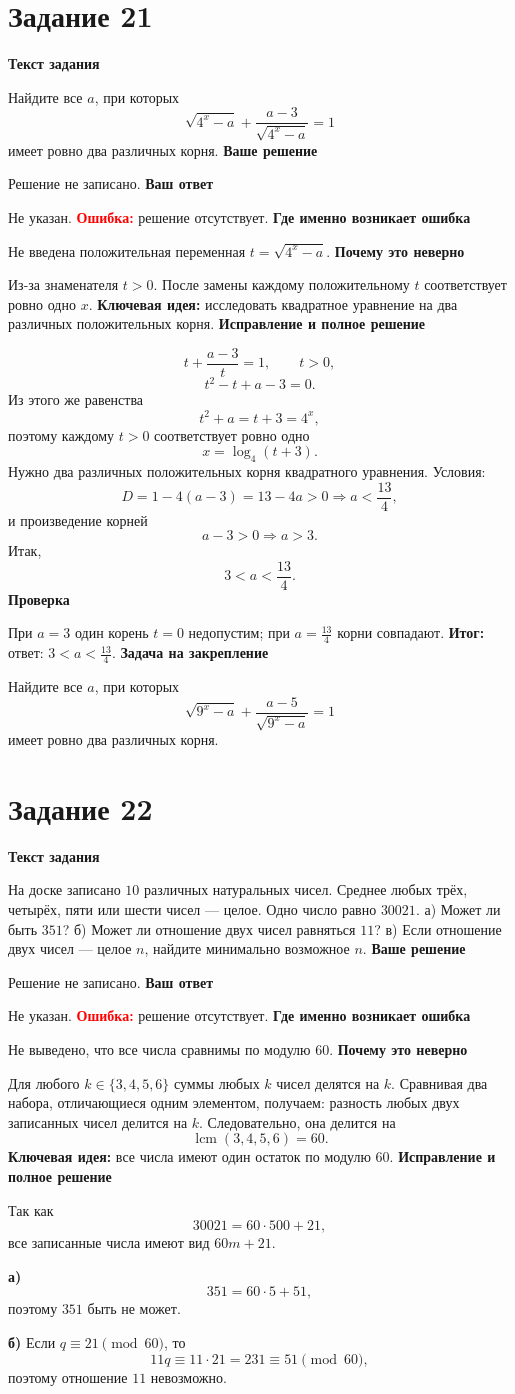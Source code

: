\documentclass[12pt,a4paper]{article}
\newcommand{\errorlabel}[1]{\textcolor{red}{\textbf{Ошибка:}} #1}
\newcommand{\keyidea}[1]{\textcolor{blue!60!black}{\textbf{Ключевая идея:}} #1}
\newcommand{\finalnote}[1]{\textcolor{teal!60!black}{\textbf{Итог:}} #1}
\newcommand{\taskhead}[1]{\newpage\phantomsection\label{task:#1}\section*{Задание #1}}
\newcommand{\subhead}[1]{\vspace{0.2em}\textbf{#1}\par}
\begin{document}
\taskhead{21}
\subhead{Текст задания}
Найдите все $a$, при которых
\[
\sqrt{4^x-a}+\frac{a-3}{\sqrt{4^x-a}}=1
\]
имеет ровно два различных корня.
\subhead{Ваше решение} Решение не записано. \subhead{Ваш ответ} Не указан.
\errorlabel{решение отсутствует.}
\subhead{Где именно возникает ошибка}
Не введена положительная переменная $t=\sqrt{4^x-a}$.
\subhead{Почему это неверно}
Из-за знаменателя $t>0$. После замены каждому положительному $t$ соответствует ровно одно $x$.
\keyidea{исследовать квадратное уравнение на два различных положительных корня.}
\subhead{Исправление и полное решение}
\[
t+\frac{a-3}{t}=1,
\qquad t>0,
\]
\[
t^2-t+a-3=0.
\]
Из этого же равенства
\[
t^2+a=t+3=4^x,
\]
поэтому каждому $t>0$ соответствует ровно одно
\[
x=\log_4(t+3).
\]
Нужно два различных положительных корня квадратного уравнения. Условия:
\[
D=1-4(a-3)=13-4a>0
\Rightarrow a<\frac{13}{4},
\]
и произведение корней
\[
a-3>0
\Rightarrow a>3.
\]
Итак,
\[
3<a<\frac{13}{4}.
\]
\subhead{Проверка}
При $a=3$ один корень $t=0$ недопустим; при $a=\frac{13}{4}$ корни совпадают.
\finalnote{ответ: $3<a<\frac{13}{4}$.}
\subhead{Задача на закрепление}
Найдите все $a$, при которых
\[
\sqrt{9^x-a}+\frac{a-5}{\sqrt{9^x-a}}=1
\]
имеет ровно два различных корня.

\taskhead{22}
\subhead{Текст задания}
На доске записано $10$ различных натуральных чисел. Среднее любых трёх, четырёх, пяти или шести чисел --- целое. Одно число равно $30021$.
а) Может ли быть $351$?
б) Может ли отношение двух чисел равняться $11$?
в) Если отношение двух чисел --- целое $n$, найдите минимально возможное $n$.
\subhead{Ваше решение} Решение не записано. \subhead{Ваш ответ} Не указан.
\errorlabel{решение отсутствует.}
\subhead{Где именно возникает ошибка}
Не выведено, что все числа сравнимы по модулю $60$.
\subhead{Почему это неверно}
Для любого $k\in\{3,4,5,6\}$ суммы любых $k$ чисел делятся на $k$. Сравнивая два набора, отличающиеся одним элементом, получаем: разность любых двух записанных чисел делится на $k$. Следовательно, она делится на
\[
\operatorname{lcm}(3,4,5,6)=60.
\]
\keyidea{все числа имеют один остаток по модулю $60$.}
\subhead{Исправление и полное решение}
Так как
\[
30021=60\cdot500+21,
\]
все записанные числа имеют вид $60m+21$.

\textbf{а)}
\[
351=60\cdot5+51,
\]
поэтому $351$ быть не может.

\textbf{б)}
Если $q\equiv21\pmod{60}$, то
\[
11q\equiv11\cdot21=231\equiv51\pmod{60},
\]
поэтому отношение $11$ невозможно.
\end{document}
